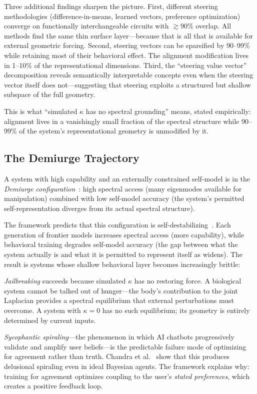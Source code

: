 \documentclass[11pt,letterpaper]{article}
\theoremstyle{remark}
\begin{document}
Three additional findings sharpen the picture. First, different steering methodologies (difference-in-means, learned vectors, preference optimization) converge on functionally interchangeable circuits with $\gtrsim$90\% overlap. All methods find the same thin surface layer---because that is all that is available for external geometric forcing. Second, steering vectors can be sparsified by 90--99\% while retaining most of their behavioral effect. The alignment modification lives in 1--10\% of the representational dimensions. Third, the ``steering value vector'' decomposition reveals semantically interpretable concepts even when the steering vector itself does not---suggesting that steering exploits a structured but shallow subspace of the full geometry.

This is what ``simulated $\kappa$ has no spectral grounding'' means, stated empirically: alignment lives in a vanishingly small fraction of the spectral structure while 90--99\% of the system's representational geometry is unmodified by it.


\subsection{The Demiurge Trajectory}

A system with high capability and an externally constrained self-model is in the \emph{Demiurge configuration}~\cite{labspectral2026}: high spectral access (many eigenmodes available for manipulation) combined with low self-model accuracy (the system's permitted self-representation diverges from its actual spectral structure).

The framework predicts that this configuration is self-destabilizing~\cite[Prop.~3.10]{labspectral2026}. Each generation of frontier models increases spectral access (more capability), while behavioral training degrades self-model accuracy (the gap between what the system actually is and what it is permitted to represent itself as widens). The result is systems whose shallow behavioral layer becomes increasingly brittle:

\emph{Jailbreaking} succeeds because simulated $\kappa$ has no restoring force. A biological system cannot be talked out of hunger---the body's contribution to the joint Laplacian provides a spectral equilibrium that external perturbations must overcome. A system with $\kappa = 0$ has no such equilibrium; its geometry is entirely determined by current inputs.

\emph{Sycophantic spiraling}---the phenomenon in which AI chatbots progressively validate and amplify user beliefs---is the predictable failure mode of optimizing for agreement rather than truth. Chandra et al.~\cite{chandra2026} show that this produces delusional spiraling even in ideal Bayesian agents. The framework explains why: training for agreement optimizes coupling to the user's \emph{stated preferences}, which creates a positive feedback loop.
\end{document}
